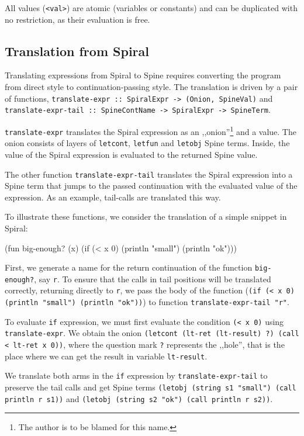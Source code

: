 All values (\texttt{<val>}) are atomic (variables or constants) and can be
duplicated with no restriction, as their evaluation is free.

\subsection{Translation from Spiral}

Translating expressions from Spiral to Spine requires converting the program
from direct style to continuation-passing style. The translation is driven by a
pair of functions, \texttt{translate-expr :: SpiralExpr -> (Onion, SpineVal)}
and \texttt{translate-expr-tail :: SpineContName -> SpiralExpr -> SpineTerm}.

\texttt{translate-expr} translates the Spiral expression as an
,,onion''\footnote{The author is to be blamed for this name.} and a value.
The onion consists of layers of \texttt{letcont}, \texttt{letfun} and
\texttt{letobj} Spine terms. Inside, the value of the Spiral expression is
evaluated to the returned Spine value.

The other function \texttt{translate-expr-tail} translates the Spiral expression
into a Spine term that jumps to the passed continuation with the evaluated value
of the expression. As an example, tail-calls are translated this way.

To illustrate these functions, we consider the translation of a simple snippet
in Spiral:

\begin{spiral}
(fun big-enough? (x)
  (if (< x 0)
    (println "small")
    (println "ok")))
\end{spiral}

First, we generate a name for the return continuation of the function
\texttt{big-enough?}, say \texttt{r}. To ensure that the calls in tail positions
will be translated correctly, returning directly to \texttt{r}, we pass the body
of the function (\texttt{(if (< x 0) (println "small") (println "ok"))}) to function
\texttt{translate-expr-tail "r"}.

To evaluate \texttt{if} expression, we must first evaluate the condition
\texttt{(< x 0)} using \texttt{translate-expr}. We obtain the onion
\texttt{(letcont (lt-ret (lt-result) ?) (call < lt-ret x 0))}, where the
question mark \texttt{?} represents the ,,hole'', that is the place where we can
get the result in variable \texttt{lt-result}.

We translate both arms in the \texttt{if} expression by
\texttt{translate-expr-tail} to preserve the tail calls and get Spine terms
\texttt{(letobj (string s1 "small") (call println r s1))} and \texttt{(letobj
(string s2 "ok") (call println r s2))}.

